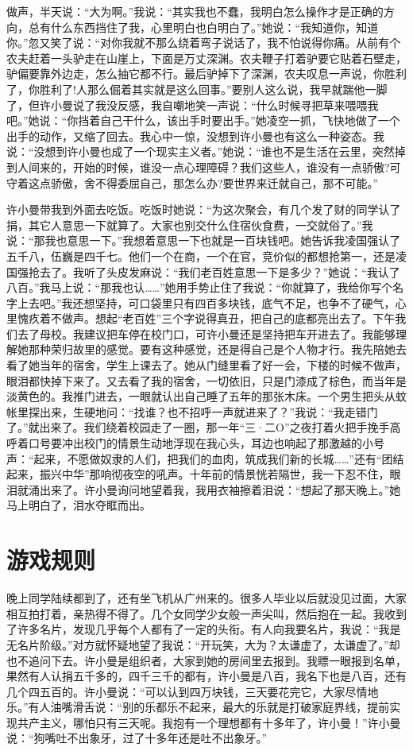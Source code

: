 \documentclass[12pt,oneside]{book}
\begin{document}
做声，半天说：``大为啊。''我说：``其实我也不蠢，我明白怎么操作才是正确的方向，总有什么东西挡住了我，心里明白也白明白了。''她说：``我知道你，知道你。''忽又笑了说：``对你我就不那么绕着弯子说话了，我不怕说得你痛。从前有个农夫赶着一头驴走在山崖上，下面是万丈深渊。农夫鞭子打着驴要它贴着石壁走，驴偏要靠外边走，怎么抽它都不行。最后驴掉下了深渊，农夫叹息一声说，你胜利了，你胜利了!人那么倔着其实就是这么回事。''要别人这么说，我早就踹他一脚了，但许小曼说了我没反感，我自嘲地笑一声说：``什么时候寻把草来喂喂我吧。''她说：``你挡着自己干什么，该出手时要出手。''她凌空一抓，飞快地做了一个出手的动作，又缩了回去。我心中一惊，没想到许小曼也有这么一种姿态。我说：``没想到许小曼也成了一个现实主义者。''她说：``谁也不是生活在云里，突然掉到人间来的，开始的时候，谁没一点心理障碍？我们这些人，谁没有一点骄傲?可守着这点骄傲，舍不得委屈自己，那怎么办?要世界来迁就自己，那不可能。''

许小曼带我到外面去吃饭。吃饭时她说：``为这次聚会，有几个发了财的同学认了捐，其它人意思一下就算了。大家也别交什么住宿伙食费，一交就俗了。''我说：``那我也意思一下。''我想着意思一下也就是一百块钱吧。她告诉我凌国强认了五千八，伍巍是四千七。他们一个在商，一个在官，竞价似的都想抢第一，还是凌国强抢去了。我听了头皮发麻说：``我们老百姓意思一下是多少？''她说：``我认了八百。''我马上说：``那我也认\ldots\ldots{}''她用手势止住了我说：``你就算了，我给你写个名字上去吧。''我还想坚持，可口袋里只有四百多块钱，底气不足，也争不了硬气，心里愧疚着不做声。想起``老百姓''三个字说得真丑，把自己的底都亮出去了。下午我们去了母校。我建议把车停在校门口，可许小曼还是坚持把车开进去了。我能够理解她那种荣归故里的感觉。要有这种感觉，还是得自己是个人物才行。我先陪她去看了她当年的宿舍，学生上课去了。她从门缝里看了好一会，下楼的时候不做声，眼泪都快掉下来了。又去看了我的宿舍，一切依旧，只是门漆成了棕色，而当年是淡黄色的。我推门进去，一眼就认出自己睡了五年的那张木床。一个男生把头从蚊帐里探出来，生硬地问：``找谁？也不招呼一声就进来了？''我说：``我走错门了。''就出来了。我们绕着校园走了一圈，那一年``三·二O''之夜打着火把手挽手高呼着口号要冲出校门的情景生动地浮现在我心头，耳边也响起了那激越的小号声：``起来，不愿做奴隶的人们，把我们的血肉，筑成我们新的长城\ldots\ldots{}''还有``团结起来，振兴中华''那响彻夜空的吼声。十年前的情景恍若隔世，我一下忍不住，眼泪就涌出来了。许小曼询问地望着我，我用衣袖擦着泪说：``想起了那天晚上。''她马上明白了，泪水夺眶而出。


\chapter{游戏规则}

晚上同学陆续都到了，还有坐飞机从广州来的。很多人毕业以后就没见过面，大家相互拍打着，亲热得不得了。几个女同学少女般一声尖叫，然后抱在一起。我收到了许多名片，发现几乎每个人都有了一定的头衔。有人向我要名片，我说：``我是无名片阶级。''对方就怀疑地望了我说：``开玩笑，大为？太谦虚了，太谦虚了。''却也不追问下去。许小曼是组织者，大家到她的房间里去报到。我瞟一眼报到名单，果然有人认捐五千多的，四千三千的都有，许小曼是八百，我名下也是八百，还有几个四五百的。许小曼说：``可以认到四万块钱，三天要花完它，大家尽情地乐。''有人油嘴滑舌说：``别的乐都乐不起来，最大的乐就是打破家庭界线，提前实现共产主义，哪怕只有三天呢。我抱有一个理想都有十多年了，许小曼！''许小曼说：``狗嘴吐不出象牙，过了十多年还是吐不出象牙。''
\end{document}
